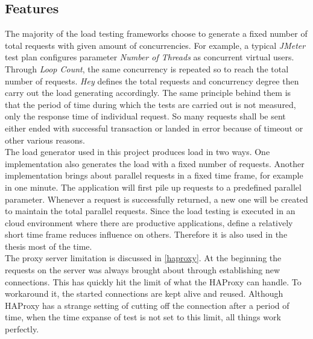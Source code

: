 \subsection{Features}
\label{load generator}
The majority of the load testing frameworks choose to generate a fixed number of total requests with given amount of concurrencies.  For example, a typical \textit{JMeter} test plan configures parameter \textit{Number of Threads} as concurrent virtual users. Through \textit{Loop Count}, the same concurrency is repeated so to reach the total number of requests. \textit{Hey} defines the total requests and concurrency degree then carry out the load generating accordingly. The same principle behind them is that the period of time during which the tests are carried out is not measured, only the response time of individual request. So many requests shall be sent either ended with successful transaction or landed in error because of timeout or other various reasons. \\
The load generator used in this project produces load in two ways. One implementation also generates the load with a fixed number of requests. Another implementation brings about parallel requests in a fixed time frame, for example in one minute. The application will first pile up requests to a predefined parallel parameter. Whenever a request is successfully returned, a new one will be created to maintain the total parallel requests. Since the load testing is executed in an cloud environment where there are productive applications, define a relatively short time frame reduces influence on others. Therefore it is also used in the thesis most of the time.\\
The proxy server limitation is discussed in \ref{haproxy}. At the beginning the requests on the server was always brought about through establishing new connections. This has quickly hit the limit of what the HAProxy can handle. To workaround it, the started connections are kept alive and reused. Although HAProxy has a strange setting of cutting off the connection after a period of time, when the time expanse of test is not set to this limit, all things work perfectly. 

